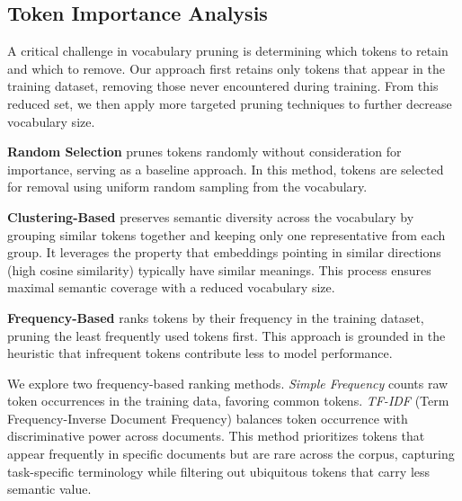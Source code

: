 \documentclass[twocolumn]{article}
\begin{document}

\subsection{Token Importance Analysis}
A critical challenge in vocabulary pruning is determining which tokens to retain and which to remove.
Our approach first retains only tokens that appear in the training dataset, removing those never encountered during training. From this reduced set, we then apply more targeted pruning techniques to further decrease vocabulary size.

\textbf{Random Selection}
prunes tokens randomly without consideration for importance, serving as a baseline approach. In this method, tokens are selected for removal using uniform random sampling from the vocabulary.

\textbf{Clustering-Based}
preserves semantic diversity across the vocabulary by grouping similar tokens together and keeping only one representative from each group. It leverages the property that embeddings pointing in similar directions (high cosine similarity) typically have similar meanings\cite{mikolov2013efficient}. 
This process ensures maximal semantic coverage with a reduced vocabulary size.

\textbf{Frequency-Based} ranks tokens by their frequency in the training dataset, pruning the least frequently used tokens first. This approach is grounded in the heuristic that infrequent tokens contribute less to model performance.~\cite {li2024enhancing}

We explore two frequency-based ranking methods. 
\textit{Simple Frequency} counts raw token occurrences in the training data, favoring common tokens.
\textit{TF-IDF} (Term Frequency-Inverse Document Frequency) balances token occurrence with discriminative power across documents. This method prioritizes tokens that appear frequently in specific documents but are rare across the corpus, capturing task-specific terminology while filtering out ubiquitous tokens that carry less semantic value. 
\end{document}
